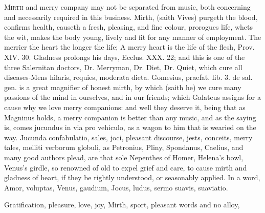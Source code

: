 {\lettrine{M}{irth} and merry company may not be separated from music, both
concerning and necessarily required in this business. Mirth, (saith
Vives) purgeth the blood, confirms health, causeth a fresh,
pleasing, and fine colour, prorogues life, whets the wit, makes the
body young, lively and fit for any manner of employment. The merrier
the heart the longer the life; A merry heart is the life of the flesh,
Prov. XIV. 30. Gladness prolongs his days, Ecclus. XXX. 22; and this is
one of the three Salernitan doctors, Dr. Merryman, Dr. Diet, Dr. Quiet,
which cure all diseases-Mens hilaris, requies, moderata dieta.
Gomesius, praefat. lib. 3. de sal. gen. is a great magnifier of
honest mirth, by which (saith he) we cure many passions of the mind in
ourselves, and in our friends; which Galateus assigns for a cause
why we love merry companions: and well they deserve it, being that as
Magninus holds, a merry companion is better than any music, and
as the saying is, comes jucundus in via pro vehiculo, as a wagon to him
that is wearied on the way. Jucunda confabulatio, sales, joci, pleasant
discourse, jests, conceits, merry tales, melliti verborum globuli, as
Petronius,  Pliny, Spondanus, Caelius, and many good
authors plead, are that sole Nepenthes of Homer, Helena's bowl, Venus's
girdle, so renowned of old to expel grief and care, to cause
mirth and gladness of heart, if they be rightly understood, or
seasonably applied. In a word,
Amor, voluptas, Venus, gaudium,
Jocus, ludus, sermo suavis, suaviatio.

Gratification, pleasure, love, joy,
Mirth, sport, pleasant words and no alloy,

}
